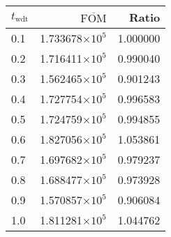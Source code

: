 \begin{tabular}{lrr}
\toprule
$t_{\mathrm{wdt}}$ & $\overline{\mathrm{FOM}}$ &    Ratio \\
\midrule
               0.1 &   1.733678$\times 10^{5}$ & 1.000000 \\
               0.2 &   1.716411$\times 10^{5}$ & 0.990040 \\
               0.3 &   1.562465$\times 10^{5}$ & 0.901243 \\
               0.4 &   1.727754$\times 10^{5}$ & 0.996583 \\
               0.5 &   1.724759$\times 10^{5}$ & 0.994855 \\
               0.6 &   1.827056$\times 10^{5}$ & 1.053861 \\
               0.7 &   1.697682$\times 10^{5}$ & 0.979237 \\
               0.8 &   1.688477$\times 10^{5}$ & 0.973928 \\
               0.9 &   1.570857$\times 10^{5}$ & 0.906084 \\
               1.0 &   1.811281$\times 10^{5}$ & 1.044762 \\
\bottomrule
\end{tabular}
